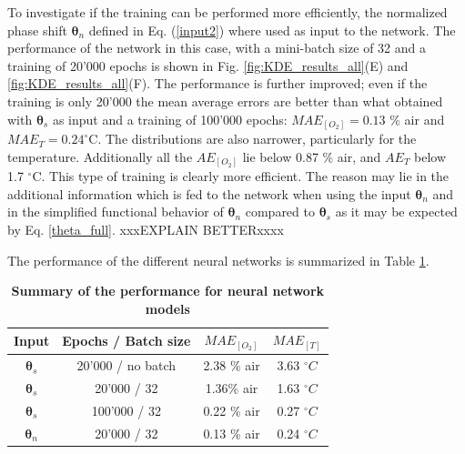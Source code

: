 \documentclass[9pt,twocolumn,twoside,pdftex]{optica}
\begin{document}
To investigate if the training can be performed more efficiently, the normalized phase shift ${\pmb \theta}_n$ defined in Eq. (\ref{input2}) where used as input to the network. The performance of the network in this case, with a mini-batch size of 32 and a training of 20'000 epochs is shown in Fig. \ref{fig:KDE_results_all}(E) and \ref{fig:KDE_results_all}(F). The performance is further improved; even if the training is only 20'000 the mean average errors are better than what obtained with ${\pmb \theta}_s$ as input and a training of 100'000 epochs: $MAE_{[O_2]}=0.13$ \% air and $MAE_{T}=0.24^\circ$C. The distributions are also narrower, particularly for the temperature. Additionally all the $AE_{[O_2]}$ lie below 0.87 \% air, and  $AE_{T}$ below 1.7 $^\circ$C. This type of training is clearly more efficient. The reason may lie in the additional information which is fed to the network when using the input ${\pmb \theta}_n$ and in the simplified functional behavior of ${\pmb \theta}_n$ compared to ${\pmb \theta}_s$ as it may be expected by Eq. \ref{theta_full}. xxxEXPLAIN BETTERxxxx


The performance of the different neural networks is summarized in Table \ref{TableMAE_summary}. 
\begin{table}[hbt]
\centering
\caption {\bf Summary of the performance for neural network models}

\begin{tabular}{ cccc}
\smallskip 
 Input & Epochs / Batch size & $MAE_{[O_2]}$ & $MAE_{[T]}$  \\ 
 \hline
${\pmb \theta}_s$ & 20'000 / \textrm{no batch} & 2.38 \% air & 3.63 $^\circ C$\\ 
${\pmb \theta}_s$ & 20'000 / 32 & 1.36\% air & 1.63 $^\circ C$\\ 
${\pmb \theta}_s$& 100'000 / 32 & 0.22 \% air & 0.27 $^\circ C$\\ 
${\pmb \theta}_n$ & 20'000 / 32 & 0.13 \% air & 0.24 $^\circ C$\\ 

\end{tabular}
\label{TableMAE_summary}
\end{table}
\end{document}
